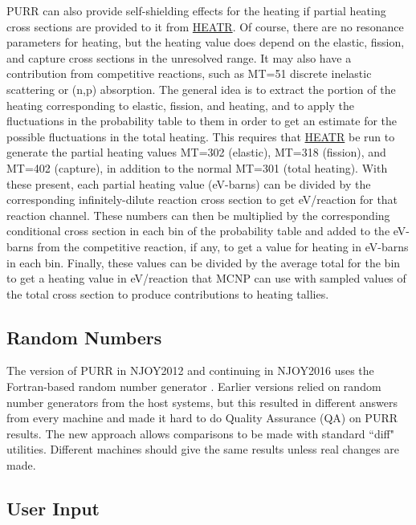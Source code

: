 PURR can also provide self-shielding effects for the heating if
partial heating cross sections are provided to it from
\hyperlink{sHEATRhy}{HEATR}.  Of course,
there are no resonance parameters
for heating, but the heating value does depend on the elastic,
fission, and capture cross sections in the unresolved range.  It
may also have a contribution from competitive reactions, such as
MT=51 discrete inelastic scattering or (n,p) absorption.  The general
idea is to extract the portion of the heating corresponding to
elastic, fission, and heating, and to apply the fluctuations in
the probability table to them in order to get an estimate for
the possible fluctuations in the total heating.  This requires
that \hyperlink{sHEATRhy}{HEATR} be run to generate
the partial heating values MT=302
(elastic), MT=318 (fission), and MT=402 (capture), in addition
to the normal MT=301 (total heating).  With these present, each
partial heating value (eV-barns) can be divided by the
corresponding infinitely-dilute reaction cross section to
get eV/reaction for that reaction channel.  These numbers can
then be multiplied by the corresponding conditional cross section
in each bin of the probability table and added to the eV-barns from
the competitive reaction, if any, to get a value for heating in
eV-barns in each bin.  Finally, these values can be divided by the
average total for the bin to get a heating value in eV/reaction that
MCNP can use with sampled values of the total cross section to
produce contributions to heating tallies.


\subsection{Random Numbers}
\label{ssPURR_random}

The version of PURR in NJOY2012 and continuing in NJOY2016 uses the
Fortran-based random number generator .  Earlier versions
relied on random number generators from the host systems, but this
resulted in different answers from every machine and made it hard to do
Quality Assurance (QA) on PURR results.  The new approach allows
comparisons to be made with standard ``diff" utilities.  Different
machines should give the same results unless real changes are made.

\subsection{User Input}
\label{ssPURR_inp}

